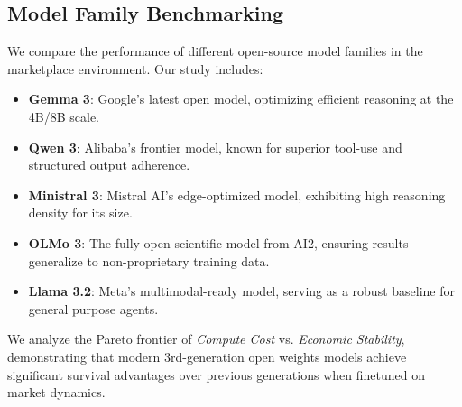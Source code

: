 \subsection{Model Family Benchmarking}
We compare the performance of different open-source model families in the marketplace environment. Our study includes:
\begin{itemize}
    \item \textbf{Gemma 3}: Google's latest open model, optimizing efficient reasoning at the 4B/8B scale.
    \item \textbf{Qwen 3}: Alibaba's frontier model, known for superior tool-use and structured output adherence.
    \item \textbf{Ministral 3}: Mistral AI's edge-optimized model, exhibiting high reasoning density for its size.
    \item \textbf{OLMo 3}: The fully open scientific model from AI2, ensuring results generalize to non-proprietary training data.
    \item \textbf{Llama 3.2}: Meta's multimodal-ready model, serving as a robust baseline for general purpose agents.
\end{itemize}
We analyze the Pareto frontier of \textit{Compute Cost} vs. \textit{Economic Stability}, demonstrating that modern 3rd-generation open weights models achieve significant survival advantages over previous generations when finetuned on market dynamics.
